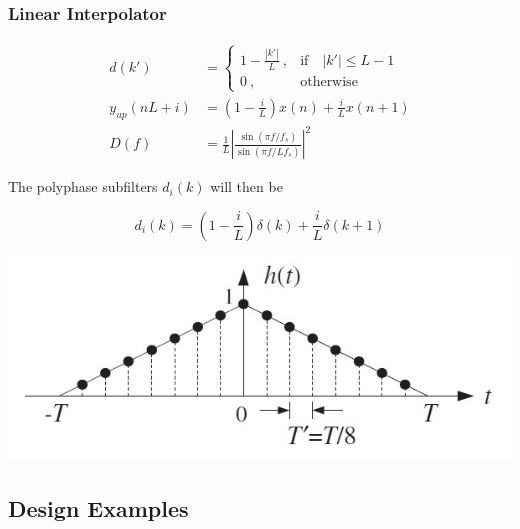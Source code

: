 \subsubsection{Linear Interpolator}
\begin{multicols}{2}
	\begin{align*}
		d(k') &= \begin{cases}
			1-\frac{|k'|}{L}\:, & \text{if} \quad |k'|\leq L -1\\
			0\:, & \text{otherwise}
		\end{cases} \\
		y_{up}(nL+i) &= (1-\frac{i}{L})x(n)+\frac{i}{L}x(n+1) \\
		D(f) &= \frac{1}{L}\left|\frac{\sin(\pi f/f_s)}{\sin(\pi f/Lf_s)}\right|^2
	\end{align*}

	The polyphase subfilters $d_i(k)$ will then be

	\begin{equation*}
		d_i(k) = (1-\frac{i}{L}) \delta(k) + \frac{i}{L} \delta(k+1)
	\end{equation*}
\vfill
\columnbreak
	\begin{center}
		\includegraphics[width=0.8\linewidth]{images/IntDecOv_Linear.jpg}
	\end{center}
\vfill
\end{multicols}


\subsection{Design Examples}
